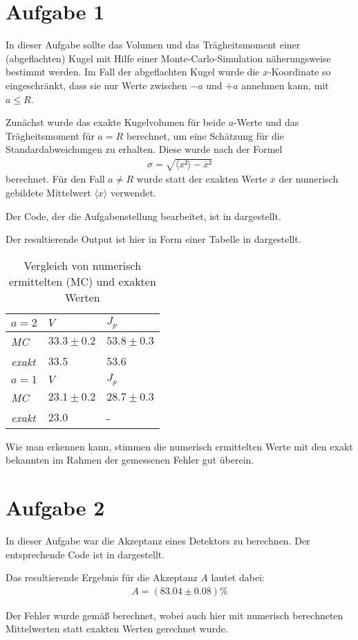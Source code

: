 \section*{Aufgabe 1}
In dieser Aufgabe sollte das Volumen und das Trägheitsmoment einer (abgeflachten)
Kugel mit Hilfe einer Monte-Carlo-Simulation näherungsweise bestimmt werden. Im Fall
der abgeflachten Kugel wurde die $x$-Koordinate so eingeschränkt, dass sie nur Werte 
zwischen $-a$ und $+a$ annehmen kann, mit $a\le R$.

Zunächst wurde das exakte Kugelvolumen für beide $a$-Werte und das Trägheitsmoment
für $a=R$ berechnet, um eine Schätzung für die Standardabweichungen zu erhalten.
Diese wurde nach der Formel
\begin{eqnarray}
σ = \sqrt{\langle x²\rangle - \overline{x}²}
\label{eqn:sigma}
\end{eqnarray}
berechnet. Für den Fall $a\ne R$ wurde statt der exakten Werte $\overline{x}$ der numerisch
gebildete Mittelwert $\langle x \rangle$ verwendet.

Der Code, der die Aufgabenstellung bearbeitet, ist in  dargestellt.



Der resultierende Output ist hier in Form einer Tabelle in  dargestellt.

\begin{table}[htbp]
\centering
\setlength{\tabcolsep}{14pt}
\begin{tabular*}{0.5\columnwidth}{lll}
\toprule
$a = 2$ & {$V$} & {$J_p$}\\
\midrule
\textit{MC} & $ 33.3\pm0.2 $ & $ 53.8\pm0.3 $ \\
\textit{exakt} & $ 33.5 $ & $ 53.6 $ \\
\midrule
$a = 1$ & {$V$} & {$J_p$}\\
\midrule
\textit{MC} & $ 23.1\pm0.2 $ & $ 28.7\pm0.3 $ \\
\textit{exakt} & $ 23.0 $ & - \\
\bottomrule
\end{tabular*}
\caption{Vergleich von numerisch ermittelten (MC) und exakten Werten}
\label{tab:erg}
\end{table}

Wie man erkennen kann, stimmen die numerisch ermittelten Werte mit den exakt bekannten
im Rahmen der gemessenen Fehler gut überein.

\section*{Aufgabe 2}
In dieser Aufgabe war die Akzeptanz eines Detektors zu berechnen. Der entsprechende
Code ist in  dargestellt.



Das resultierende Ergebnis für die Akzeptanz $A$ lautet dabei:
\begin{eqnarray}
A = (83.04 \pm 0.08)\%
\end{eqnarray}

Der Fehler wurde gemäß  berechnet, wobei auch hier mit numerisch
berechneten Mittelwerten statt exakten Werten gerechnet wurde.